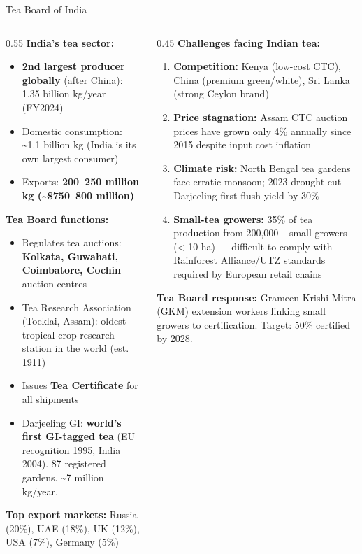 \documentclass[
  ignorenonframetext,
  aspectratio=169,
]{beamer}
\makeatletter
\providecommand{\tightlist}{%
  \setlength{\itemsep}{0pt}\setlength{\parskip}{0pt}}
\let\quarto@originallabel\label
\DeclareRobustCommand*{\label}[1]{\quarto@originallabel{#1}}
\makeatother
\begin{document}
\begin{frame}{Tea Board of India}
\label{tea-board-of-india}
\begin{columns}[T]
\begin{column}{0.55\linewidth}
\textbf{India's tea sector:}

\begin{itemize}
\tightlist
\item
  \textbf{2nd largest producer globally} (after China): 1.35 billion
  kg/year (FY2024)
\item
  Domestic consumption: \textasciitilde1.1 billion kg (India is its own
  largest consumer)
\item
  Exports: \textbf{200--250 million kg (\textasciitilde\$750--800
  million)}
\end{itemize}

\textbf{Tea Board functions:}

\begin{itemize}
\tightlist
\item
  Regulates tea auctions: \textbf{Kolkata, Guwahati, Coimbatore, Cochin}
  auction centres
\item
  Tea Research Association (Tocklai, Assam): oldest tropical crop
  research station in the world (est. 1911)
\item
  Issues \textbf{Tea Certificate} for all shipments
\item
  Darjeeling GI: \textbf{world's first GI-tagged tea} (EU recognition
  1995, India 2004). 87 registered gardens. \textasciitilde7 million
  kg/year.
\end{itemize}

\textbf{Top export markets:} Russia (20\%), UAE (18\%), UK (12\%), USA
(7\%), Germany (5\%)
\end{column}

\begin{column}{0.45\linewidth}
\textbf{Challenges facing Indian tea:}

\begin{enumerate}
\tightlist
\item
  \textbf{Competition:} Kenya (low-cost CTC), China (premium
  green/white), Sri Lanka (strong Ceylon brand)
\item
  \textbf{Price stagnation:} Assam CTC auction prices have grown only
  4\% annually since 2015 despite input cost inflation
\item
  \textbf{Climate risk:} North Bengal tea gardens face erratic monsoon;
  2023 drought cut Darjeeling first-flush yield by 30\%
\item
  \textbf{Small-tea growers:} 35\% of tea production from 200,000+ small
  growers (\textless{} 10 ha) --- difficult to comply with Rainforest
  Alliance/UTZ standards required by European retail chains
\end{enumerate}

\textbf{Tea Board response:} Grameen Krishi Mitra (GKM) extension
workers linking small growers to certification. Target: 50\% certified
by 2028.
\end{column}
\end{columns}
\end{frame}
\end{document}
